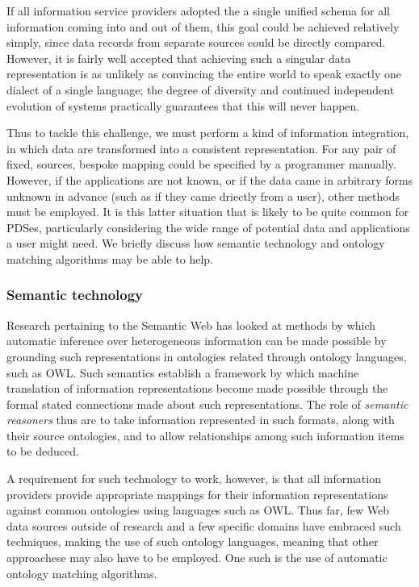 \documentclass[graybox]{svmult}
\begin{document}
If all information service providers adopted the a single unified schema for all information coming into and out of them, this goal could be achieved relatively simply, since data records from separate sources could be directly compared.  However, it is fairly well accepted that achieving such a singular data representation is as unlikely as convincing the entire world to speak exactly one dialect of a single language; the degree of diversity and continued independent evolution of systems practically guarantees that this will never happen\cite{}. 

Thus to tackle this challenge, we must perform a kind of information integration, in which data are transformed into a consistent representation.  For any pair of fixed, sources, bespoke mapping could be specified by a programmer manually.  However, if the applications are not known, or if the data came in arbitrary forms unknown in advance (such as if they came driectly from a user), other methods must be employed.  It is this latter situation that is likely to be quite common for PDSes, particularly considering the wide range of potential data and applications a user might need.  We briefly discuss how semantic technology and ontology matching algorithms may be able to help.

\subsubsection{Semantic technology}

Research pertaining to the Semantic Web\emph{} has looked at methods by which automatic inference over heterogeneous information can be made possible by grounding such representations in ontologies related through ontology languages, such as OWL\cite{antoniou2004web}.  Such semantics establish a framework by which machine translation of information representations become made possible through the formal stated connections made about such representations.  The role of \emph{semantic reasoners} thus are to take information represented in such formats, along with their source ontologies, and to allow relationships among such information items to be deduced. 

A requirement for such technology to work, however, is that all information providers provide appropriate mappings for their information representations against common ontologies using languages such as OWL.  Thus far, few Web data sources outside of research and a few specific domains have embraced such techniques, making the use of such ontology languages, meaning that other approachese may also have to be employed. One such is the use of automatic ontology matching algorithms.
\end{document}
